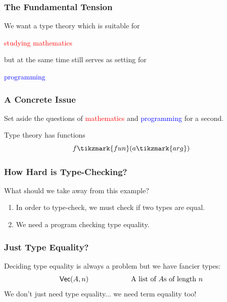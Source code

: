 \documentclass[usenames,dvipsnames,aspectratio=169,12pt]{beamer}
\begin{document}
\begin{frame}
  \frametitle{The Fundamental Tension}

  We want a type theory which is suitable for

  \begin{center}
    \textcolor{Red}{studying mathematics}
  \end{center}

  but at the same time still serves as setting for

  \begin{center}
    \textcolor{Blue}{programming}
  \end{center}

\end{frame}

\begin{frame}
  \frametitle{A Concrete Issue}
  Set aside the questions of \textcolor{Red}{mathematics} and \textcolor{Blue}{programming} for a
  second.
  \bigskip

  Type theory has functions
  \[
    \App{f\tikzmark{fun}}{a\tikzmark{arg}}
  \]
\end{frame}

\begin{frame}
  \frametitle{How Hard is Type-Checking?}
  What should we take away from this example?
  \begin{enumerate}
  \item In order to type-check, we must check if two types are equal.
  \item We need a program checking type equality.
  \end{enumerate}
\end{frame}

\begin{frame}
  \frametitle{Just Type Equality?}
  Deciding type equality is always a problem but we have fancier types:
  \[
    \mathsf{Vec}(A, n) \qquad\quad\qquad\quad\text{A list of $A$s of length $n$}
  \]
  \pause
  We don't just need type equality... we need term equality too!
\end{frame}
\end{document}
